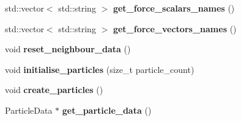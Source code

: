 \begin{DoxyCompactItemize}
\item 
\mbox{\label{namespacewash_aaf7c907c156c086ad032365076e04b92}} 
std\+::vector$<$ std\+::string $>$ {\bfseries get\+\_\+force\+\_\+scalars\+\_\+names} ()
\item 
\mbox{\label{namespacewash_ae42fc803544c64f176f65f72e0fc1fe0}} 
std\+::vector$<$ std\+::string $>$ {\bfseries get\+\_\+force\+\_\+vectors\+\_\+names} ()
\item 
\mbox{\label{namespacewash_aaa0505290c83069eeb4f67744d4b8f1e}} 
void {\bfseries reset\+\_\+neighbour\+\_\+data} ()
\item 
\mbox{\label{namespacewash_a0bc7b17c64c2b0f7bdd6c7c2d30f2398}} 
void {\bfseries initialise\+\_\+particles} (size\+\_\+t particle\+\_\+count)
\item 
\mbox{\label{namespacewash_a34943cddac15887cbaca01af7ca106c5}} 
void {\bfseries create\+\_\+particles} ()
\item 
\mbox{\label{namespacewash_aa3671e8d906a2f71aa6a17ce42029ad5}} 
Particle\+Data $\ast$ {\bfseries get\+\_\+particle\+\_\+data} ()
\end{DoxyCompactItemize}
